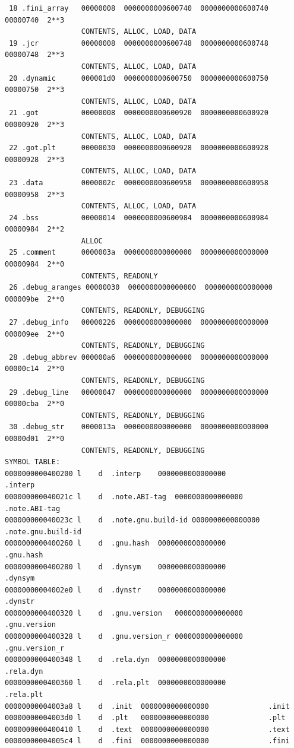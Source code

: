 \begin{verbatim}
 18 .fini_array   00000008  0000000000600740  0000000000600740  00000740  2**3
                  CONTENTS, ALLOC, LOAD, DATA
 19 .jcr          00000008  0000000000600748  0000000000600748  00000748  2**3
                  CONTENTS, ALLOC, LOAD, DATA
 20 .dynamic      000001d0  0000000000600750  0000000000600750  00000750  2**3
                  CONTENTS, ALLOC, LOAD, DATA
 21 .got          00000008  0000000000600920  0000000000600920  00000920  2**3
                  CONTENTS, ALLOC, LOAD, DATA
 22 .got.plt      00000030  0000000000600928  0000000000600928  00000928  2**3
                  CONTENTS, ALLOC, LOAD, DATA
 23 .data         0000002c  0000000000600958  0000000000600958  00000958  2**3
                  CONTENTS, ALLOC, LOAD, DATA
 24 .bss          00000014  0000000000600984  0000000000600984  00000984  2**2
                  ALLOC
 25 .comment      0000003a  0000000000000000  0000000000000000  00000984  2**0
                  CONTENTS, READONLY
 26 .debug_aranges 00000030  0000000000000000  0000000000000000  000009be  2**0
                  CONTENTS, READONLY, DEBUGGING
 27 .debug_info   00000226  0000000000000000  0000000000000000  000009ee  2**0
                  CONTENTS, READONLY, DEBUGGING
 28 .debug_abbrev 000000a6  0000000000000000  0000000000000000  00000c14  2**0
                  CONTENTS, READONLY, DEBUGGING
 29 .debug_line   00000047  0000000000000000  0000000000000000  00000cba  2**0
                  CONTENTS, READONLY, DEBUGGING
 30 .debug_str    0000013a  0000000000000000  0000000000000000  00000d01  2**0
                  CONTENTS, READONLY, DEBUGGING
SYMBOL TABLE:
0000000000400200 l    d  .interp	0000000000000000              .interp
000000000040021c l    d  .note.ABI-tag	0000000000000000              .note.ABI-tag
000000000040023c l    d  .note.gnu.build-id	0000000000000000              .note.gnu.build-id
0000000000400260 l    d  .gnu.hash	0000000000000000              .gnu.hash
0000000000400280 l    d  .dynsym	0000000000000000              .dynsym
00000000004002e0 l    d  .dynstr	0000000000000000              .dynstr
0000000000400320 l    d  .gnu.version	0000000000000000              .gnu.version
0000000000400328 l    d  .gnu.version_r	0000000000000000              .gnu.version_r
0000000000400348 l    d  .rela.dyn	0000000000000000              .rela.dyn
0000000000400360 l    d  .rela.plt	0000000000000000              .rela.plt
00000000004003a8 l    d  .init	0000000000000000              .init
00000000004003d0 l    d  .plt	0000000000000000              .plt
0000000000400410 l    d  .text	0000000000000000              .text
00000000004005c4 l    d  .fini	0000000000000000              .fini

\end{verbatim}

